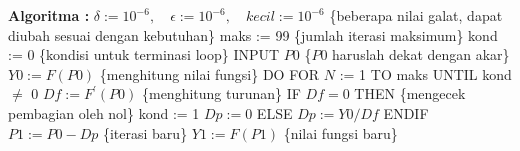 \documentclass[12pt,a4paper]{report}
\begin{document}
 \vspace*{0.2cm} 
\newline
\textbf{Algoritma :}\newline
$\delta := 10^{-6}, \quad \epsilon := 10^{-6}, \quad kecil := 10^{-6}$ \quad \newline \{beberapa nilai galat, dapat diubah sesuai dengan kebutuhan\}\newline
maks := 99 \quad \quad \{jumlah iterasi maksimum\}\newline
kond := 0 \quad \quad \{kondisi untuk terminasi loop\}\newline
INPUT $P0$ \quad \quad \{$P0$ haruslah dekat dengan akar\} \newline
$Y0:=F(P0)$ \quad \quad \{menghitung nilai fungsi\}\newline
\newline
DO FOR $N$ := 1 TO maks UNTIL kond $\neq$ 0\newline
\hspace*{.2in} $Df := F^{\prime}(P0)$ \quad \quad \{menghitung turunan\}%
\newline
\hspace*{.5in} IF $Df = 0$ THEN \quad \quad \{mengecek pembagian oleh nol\}%
\newline
\hspace*{1in} kond := 1\newline
\hspace*{1in} $Dp := 0$\newline
\hspace*{.8in}ELSE \newline
\hspace*{1in} $Dp := Y0/Df$\newline
\hspace*{.5in}ENDIF\newline
\hspace*{.2in} $P1 := P0-Dp$ \quad \quad\{iterasi baru\}\newline
\hspace*{.2in} $Y1 := F(P1)$ \quad \quad \{nilai fungsi baru\}\newline
\end{document}
